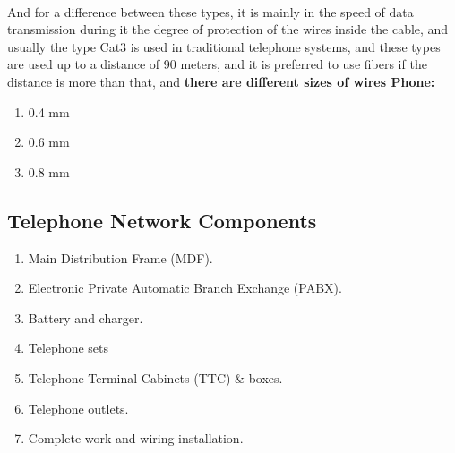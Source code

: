 \documentclass[12pt,fleqn]{book} %
\begin{document}
\\ And for a difference between these types, it is mainly in the speed of data transmission during it the degree of protection of the wires inside the cable, and usually the type Cat3 is used in traditional telephone systems, and these types are used up to a distance of 90 meters, and it is preferred to use fibers if the distance is more than that, and \textbf{there are different sizes of wires Phone:}
\begin{enumerate}
    \item 0.4 mm
    \item 0.6 mm
    \item 0.8 mm
\end{enumerate}
\subsection{Telephone Network Components}
\begin{enumerate}
\item Main Distribution Frame (MDF).
\item Electronic Private Automatic Branch Exchange (PABX).
\item Battery and charger.
\item Telephone sets
\item Telephone Terminal Cabinets (TTC) & boxes.
\item Telephone outlets.
\item Complete work and wiring installation.
\end{enumerate}
\end{document}
